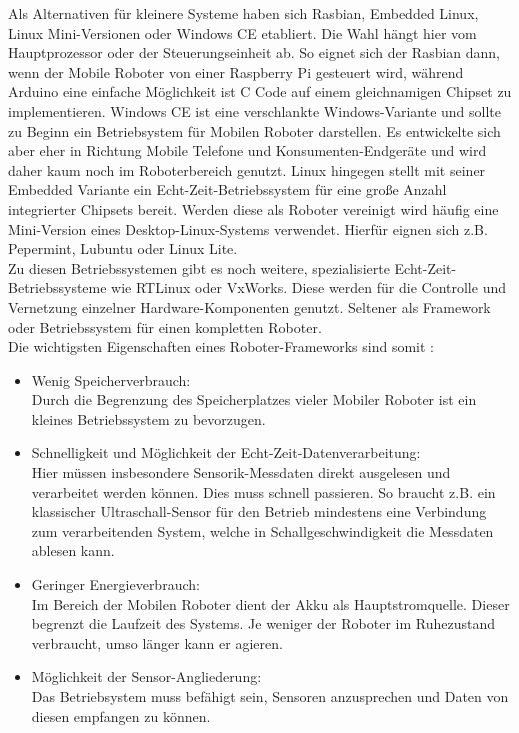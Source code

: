 \documentclass[twoside,11pt, a4paper]{report}
\begin{document}
	Als Alternativen für kleinere Systeme haben sich Rasbian, Embedded Linux, Linux Mini-Versionen oder Windows CE etabliert. Die Wahl hängt hier vom Hauptprozessor oder der Steuerungseinheit ab. So eignet sich der Rasbian dann, wenn der Mobile Roboter von einer Raspberry Pi gesteuert wird, während Arduino eine einfache Möglichkeit ist C Code auf einem gleichnamigen Chipset zu implementieren. Windows CE ist eine verschlankte Windows-Variante und sollte zu Beginn ein Betriebsystem für Mobilen Roboter darstellen. Es entwickelte sich aber eher in Richtung Mobile Telefone und Konsumenten-Endgeräte und wird daher kaum noch im Roboterbereich genutzt. Linux hingegen stellt mit seiner Embedded Variante ein Echt-Zeit-Betriebssystem für eine große Anzahl integrierter Chipsets bereit. Werden diese als Roboter vereinigt wird häufig eine Mini-Version eines Desktop-Linux-Systems verwendet. Hierfür eignen sich z.B. Pepermint, Lubuntu oder Linux Lite.   \\
	Zu diesen Betriebssystemen gibt es noch weitere, spezialisierte Echt-Zeit-Betriebssysteme wie RTLinux oder VxWorks. Diese werden für die Controlle und Vernetzung einzelner Hardware-Komponenten genutzt. Seltener als Framework oder Betriebssystem für einen kompletten Roboter. \\
	
	Die wichtigsten Eigenschaften eines Roboter-Frameworks sind somit :
	\begin{itemize}
		\item Wenig Speicherverbrauch:\\
		Durch die Begrenzung des Speicherplatzes vieler Mobiler Roboter ist ein kleines Betriebssystem zu bevorzugen. 
		\item Schnelligkeit und Möglichkeit der Echt-Zeit-Datenverarbeitung: \\
		Hier müssen insbesondere Sensorik-Messdaten direkt ausgelesen und verarbeitet werden können. Dies muss schnell passieren. So braucht z.B. ein klassischer Ultraschall-Sensor für den Betrieb mindestens eine Verbindung zum verarbeitenden System, welche in Schallgeschwindigkeit die Messdaten ablesen kann. 
		\item Geringer Energieverbrauch:\\
		Im Bereich der Mobilen Roboter dient der Akku als Hauptstromquelle. Dieser begrenzt die Laufzeit des Systems. Je weniger der Roboter im Ruhezustand verbraucht, umso länger kann er agieren. 
		\item Möglichkeit der Sensor-Angliederung:\\
		Das Betriebsystem muss befähigt sein, Sensoren anzusprechen und Daten von diesen empfangen zu können.
	\end{itemize}
	
\end{document}
